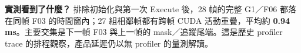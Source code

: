\textbf{實測看到了什麼？} 排除初始化與第一次 Execute 後，28 幀的完整 G1／F06 都落在同幀 F03 的時間窗內；27 組相鄰幀都有跨幀 CUDA 活動重疊，平均約 \textbf{0.94 ms}。主要交集是下一幀 F03 與上一幀的 mask／追蹤尾端。這是歷史 profiler trace 的排程觀察，產品延遲仍以無 profiler 的量測解讀。\cite{nsys}
